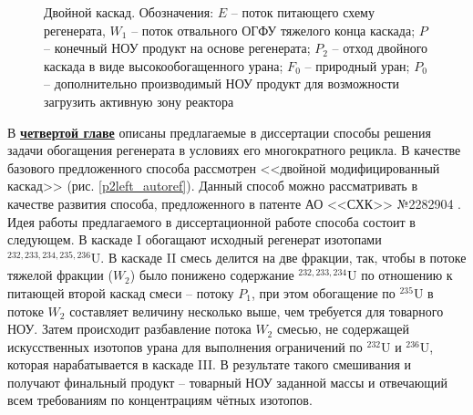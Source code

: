 \begin{figure}[ht]
  \caption{Двойной каскад. Обозначения: $E$ -- поток питающего схему регенерата, $W_1$ -- поток отвального ОГФУ тяжелого конца каскада; $P$ -- конечный НОУ продукт на основе регенерата; $P_2$ -- отход двойного каскада в виде высокообогащенного урана; $F_0$ -- природный уран; $P_0$ -- дополнительно производимый НОУ продукт для возможности загрузить активную зону реактора}\label{fig:double_ru_in3}
\end{figure}


В \underline{\textbf{четвертой главе}} описаны предлагаемые в диссертации способы решения задачи обогащения регенерата в условиях его многократного рецикла.
В качестве базового предложенного способа рассмотрен <<двойной модифицированный каскад>> (рис. \ref{p2left_autoref}). Данный способ можно рассматривать в качестве развития способа, предложенного в патенте АО <<СХК>> №2282904 \cite{vodolazskihSposobIzotopnogoVosstanovleniya2006}. Идея работы предлагаемого в диссертационной работе способа состоит в следующем. В каскаде I обогащают исходный регенерат изотопами $^{232,233,234,235,236}$U. В каскаде II смесь делится на две фракции, так, чтобы в потоке тяжелой фракции ($W_2$) было понижено содержание $^{232,233,234}$U по отношению к питающей второй каскад смеси -- потоку $P_1$, при этом обогащение по $^{235}$U в потоке $W_2$ составляет величину несколько выше, чем требуется для товарного НОУ. Затем происходит разбавление потока $W_2$ смесью, не содержащей искусственных изотопов урана для выполнения ограничений по $^{232}$U и $^{236}$U, которая нарабатывается в каскаде III. В результате такого смешивания и получают финальный продукт -- товарный НОУ заданной массы и отвечающий всем требованиям по концентрациям чётных изотопов. 


